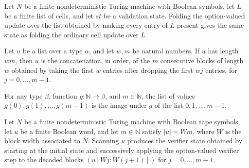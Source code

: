 \begin{lemma}
\label{Complexity.Codec.foldl_vStepO_some}
\leanok
{}
Let $N$ be a finite nondeterministic Turing machine with Boolean symbols, let $L$ be a
finite list of cells, and let $st$ be a validation state. Folding the option-valued
update over the list obtained by making every entry of $L$ present gives the same state
as folding the ordinary cell update over $L$.
\end{lemma}

\begin{lemma}
\label{Complexity.Codec.eq_flatten_blocks}
\leanok
{}
Let $u$ be a list over a type $\alpha$, and let $w,m$ be natural numbers. If $u$ has
length $wm$, then $u$ is the concatenation, in order, of the $m$ consecutive blocks of
length $w$ obtained by taking the first $w$ entries after dropping the first $wj$
entries, for $j=0,\ldots,m-1$.
\end{lemma}

\begin{lemma}
\label{Complexity.Codec.ofFn_eq_map_range}
\leanok
{}
For any type $\beta$, function $g:\mathbb{N}\to\beta$, and $m\in\mathbb{N}$, the list of
values $g(0),g(1),\ldots,g(m-1)$ is the image under $g$ of the list $0,1,\ldots,m-1$.
\end{lemma}

\begin{theorem}
\label{Complexity.Codec.vScan_eq}
\leanok
{}
Let $N$ be a finite nondeterministic Turing machine with Boolean tape symbols, let $u$
be a finite Boolean word, and let $m\in\mathbb N$ satisfy $|u|=Wm$, where $W$ is the
block width associated to $N$. Scanning $u$ produces the verifier state obtained by
starting at the initial state and successively applying the option-valued verifier step
to the decoded blocks $(u[Wj:W(j+1)])$ for $j=0,\ldots,m-1$.
\end{theorem}

